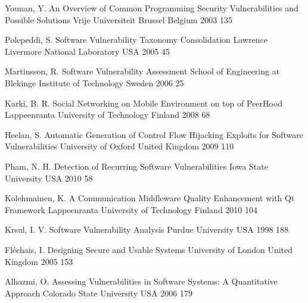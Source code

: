 \renewcommand{\refname}{REFERENCES} %
\cleardoublepage
{}
{}

\begin{thebibliography}{9}


		{Younan, Y.} %
		{An Overview of Common Programming Security Vulnerabilities and Possible Solutions}
		{Vrije Universiteit Brussel}
		{Belgium}
		{2003}
		{135}
	
		{Polepeddi, S.} %
		{Software Vulnerability Taxonomy Consolidation}
		{Lawrence Livermore National Laboratory}
		{USA}
		{2005}
		{45}
	
		{Martinsson, R.} %
		{Software Vulnerability Assessment}
		{School of Engineering at Blekinge Institute of Technology}
		{Sweden}
		{2006}
		{25}
	
		{Karki, B. R.} %
		{Social Networking on Mobile Environment on top of PeerHood}
		{Lappeenranta University of Technology}
		{Finland}
		{2008}
		{68}
	
		{Heelan, S.} %
		{Automatic Generation of Control Flow Hijacking Exploits for Software Vulnerabilities}
		{University of Oxford}
		{United Kingdom}
		{2009}
		{110}
	
		{Pham, N. H.} %
		{Detection of Recurring Software Vulnerabilities}
		{Iowa State University}
		{USA}
		{2010}
		{58}
	
		{Kolehmainen, K.} %
		{A Communication Middleware Quality Enhancement with {Qt} Framework}
		{Lappeenranta University of Technology}
		{Finland}
		{2010}
		{104}


		{Krsul, I. V.} %
		{Software Vulnerability Analysis}
		{Purdue University}
		{USA}
		{1998}
		{188}
		
		{Fl{\'{e}}chais, I.} %
		{Designing Secure and Usable Systems}
		{University of London}
		{United Kingdom}
		{2005}
		{153}
	
		{Alhazmi, O.} %
		{Assessing Vulnerabilities in Software Systems: A Quantitative Approach}
		{Colorado State University}
		{USA}
		{2006}
		{179}
		

\end{thebibliography}
